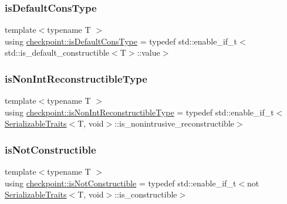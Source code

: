 \mbox{\label{namespacecheckpoint_a58224a3b056d9e2aa73d563871981a7d}} 
\subsubsection{\texorpdfstring{is\+Default\+Cons\+Type}{isDefaultConsType}}
{\footnotesize\ttfamily template$<$typename T $>$ \\
using \hyperlink{namespacecheckpoint_a58224a3b056d9e2aa73d563871981a7d}{checkpoint\+::is\+Default\+Cons\+Type} = typedef std\+::enable\+\_\+if\+\_\+t$<$std\+::is\+\_\+default\+\_\+constructible$<$T$>$\+::value$>$}

\mbox{\label{namespacecheckpoint_a46b7909fb0fef92b4787567fde7c760b}} 
\subsubsection{\texorpdfstring{is\+Non\+Int\+Reconstructible\+Type}{isNonIntReconstructibleType}}
{\footnotesize\ttfamily template$<$typename T $>$ \\
using \hyperlink{namespacecheckpoint_a46b7909fb0fef92b4787567fde7c760b}{checkpoint\+::is\+Non\+Int\+Reconstructible\+Type} = typedef std\+::enable\+\_\+if\+\_\+t$<$ \hyperlink{structcheckpoint_1_1_serializable_traits}{Serializable\+Traits}$<$T, void$>$\+::is\+\_\+nonintrusive\+\_\+reconstructible$>$}

\mbox{\label{namespacecheckpoint_a14b3c81988a2c2d3c935edcc653b6322}} 
\subsubsection{\texorpdfstring{is\+Not\+Constructible}{isNotConstructible}}
{\footnotesize\ttfamily template$<$typename T $>$ \\
using \hyperlink{namespacecheckpoint_a14b3c81988a2c2d3c935edcc653b6322}{checkpoint\+::is\+Not\+Constructible} = typedef std\+::enable\+\_\+if\+\_\+t$<$not \hyperlink{structcheckpoint_1_1_serializable_traits}{Serializable\+Traits}$<$T, void$>$\+::is\+\_\+constructible$>$}

